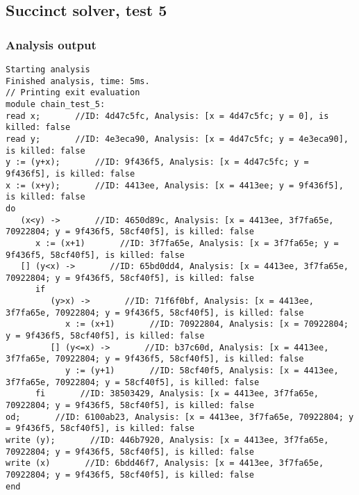 \documentclass{report}
\begin{document}
\subsection{Succinct solver, test 5}
\subsubsection{Analysis output}
\begin{lstlisting}
Starting analysis
Finished analysis, time: 5ms.
// Printing exit evaluation
module chain_test_5:
read x;       //ID: 4d47c5fc, Analysis: [x = 4d47c5fc; y = 0], is killed: false
read y;       //ID: 4e3eca90, Analysis: [x = 4d47c5fc; y = 4e3eca90], is killed: false
y := (y+x);       //ID: 9f436f5, Analysis: [x = 4d47c5fc; y = 9f436f5], is killed: false
x := (x+y);       //ID: 4413ee, Analysis: [x = 4413ee; y = 9f436f5], is killed: false
do
   (x<y) ->       //ID: 4650d89c, Analysis: [x = 4413ee, 3f7fa65e, 70922804; y = 9f436f5, 58cf40f5], is killed: false
      x := (x+1)       //ID: 3f7fa65e, Analysis: [x = 3f7fa65e; y = 9f436f5, 58cf40f5], is killed: false
   [] (y<x) ->       //ID: 65bd0dd4, Analysis: [x = 4413ee, 3f7fa65e, 70922804; y = 9f436f5, 58cf40f5], is killed: false
      if
         (y>x) ->       //ID: 71f6f0bf, Analysis: [x = 4413ee, 3f7fa65e, 70922804; y = 9f436f5, 58cf40f5], is killed: false
            x := (x+1)       //ID: 70922804, Analysis: [x = 70922804; y = 9f436f5, 58cf40f5], is killed: false
         [] (y<=x) ->       //ID: b37c60d, Analysis: [x = 4413ee, 3f7fa65e, 70922804; y = 9f436f5, 58cf40f5], is killed: false
            y := (y+1)       //ID: 58cf40f5, Analysis: [x = 4413ee, 3f7fa65e, 70922804; y = 58cf40f5], is killed: false
      fi       //ID: 38503429, Analysis: [x = 4413ee, 3f7fa65e, 70922804; y = 9f436f5, 58cf40f5], is killed: false
od;       //ID: 6100ab23, Analysis: [x = 4413ee, 3f7fa65e, 70922804; y = 9f436f5, 58cf40f5], is killed: false
write (y);       //ID: 446b7920, Analysis: [x = 4413ee, 3f7fa65e, 70922804; y = 9f436f5, 58cf40f5], is killed: false
write (x)       //ID: 6bdd46f7, Analysis: [x = 4413ee, 3f7fa65e, 70922804; y = 9f436f5, 58cf40f5], is killed: false
end
\end{lstlisting}
\end{document}
